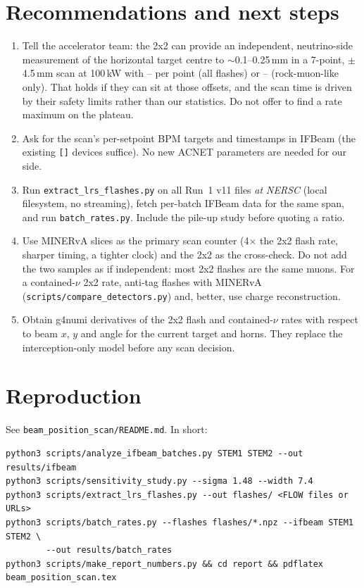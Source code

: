 \documentclass[11pt]{article}
\begin{document}
\section{Recommendations and next steps}\label{sec:next}
\begin{enumerate}
\item Tell the accelerator team: the 2x2 can provide an independent, neutrino-side
measurement of the horizontal target centre to $\sim$0.1--0.25\,mm in a 7-point,
$\pm$4.5\,mm scan at 100\,kW with \TQuarterAll--\TTenthAll{} per point (all flashes) or \TQuarterRock--\TTenthRock{} (rock-muon-like only). That holds if they can sit at
those offsets, and the scan time is driven by their safety limits rather than our
statistics. Do not offer to find a rate maximum on the plateau.
\item Ask for the scan's per-setpoint BPM targets and timestamps in IFBeam (the existing
\texttt{[]} devices suffice). No new ACNET parameters are needed for our side.
\item Run \texttt{extract\_lrs\_flashes.py} on all Run~1 v11 files \emph{at NERSC} (local
filesystem, no streaming), fetch per-batch IFBeam data for the same span, and run
\texttt{batch\_rates.py}. Include the pile-up study before quoting a ratio.
\item Use MINERvA slices as the primary scan counter (4$\times$ the 2x2 flash rate, sharper
timing, a tighter clock) and the 2x2 as the cross-check. Do not add the two samples as if
independent: most 2x2 flashes are the same muons. For a contained-$\nu$ 2x2 rate, anti-tag
flashes with MINERvA (\texttt{scripts/compare\_detectors.py}) and, better, use charge
reconstruction.
\item Obtain g4numi derivatives of the 2x2 flash and contained-$\nu$ rates with respect to
beam $x$, $y$ and angle for the current target and horns. They replace the
interception-only model before any scan decision.
\end{enumerate}

\section{Reproduction}
See \texttt{beam\_position\_scan/README.md}. In short:
\begin{verbatim}
python3 scripts/analyze_ifbeam_batches.py STEM1 STEM2 --out results/ifbeam
python3 scripts/sensitivity_study.py --sigma 1.48 --width 7.4
python3 scripts/extract_lrs_flashes.py --out flashes/ <FLOW files or URLs>
python3 scripts/batch_rates.py --flashes flashes/*.npz --ifbeam STEM1 STEM2 \
        --out results/batch_rates
python3 scripts/make_report_numbers.py && cd report && pdflatex beam_position_scan.tex
\end{verbatim}
\end{document}
